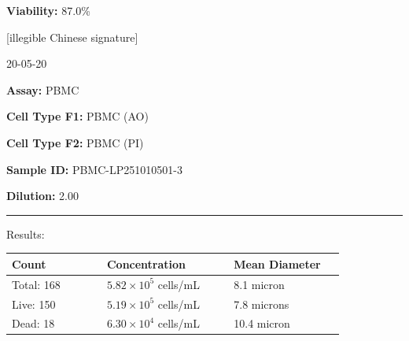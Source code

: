 \documentclass[UTF8,10pt,a4paper,fontset=fandol]{ctexart}
\newcommand{\fieldvalue}[1]{#1}
\newcommand{\handwritten}[1]{#1}
\begin{document}
\bigskip
\noindent
\textbf{Viability:}
\fieldvalue{87.0\%}

\vfill

\handwritten{[illegible Chinese signature]}

\hspace{1em}
\handwritten{20-05-20}

\newpage

\noindent\textbf{Assay:}
\fieldvalue{PBMC}

\medskip
\noindent\textbf{Cell Type F1:}
\fieldvalue{PBMC (AO)}

\noindent\textbf{Cell Type F2:}
\fieldvalue{PBMC (PI)}

\medskip
\noindent\textbf{Sample ID:}
\fieldvalue{PBMC-LP251010501-3}

\noindent\textbf{Dilution:}
\fieldvalue{2.00}

\medskip
\noindent\rule{0.48\linewidth}{0.4pt}

\medskip
\noindent Results:

\medskip
\begin{tabular}{@{}p{0.24\linewidth}p{0.32\linewidth}p{0.28\linewidth}@{}}
\textbf{Count} & \textbf{Concentration} & \textbf{Mean Diameter} \\
\hline
Total:
\fieldvalue{168}
&
\fieldvalue{$5.82 \times 10^{5}$ cells/mL}
&
\fieldvalue{8.1 micron}
\\
Live:
\fieldvalue{150}
&
\fieldvalue{$5.19 \times 10^{5}$ cells/mL}
&
\fieldvalue{7.8 microns}
\\
Dead:
\fieldvalue{18}
&
\fieldvalue{$6.30 \times 10^{4}$ cells/mL}
&
\fieldvalue{10.4 micron}
\end{tabular}
\end{document}
